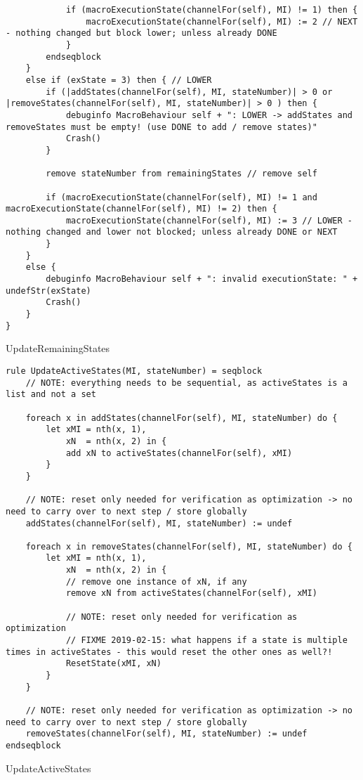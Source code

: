 \begin{listing}[H]
\begin{verbatim}
            if (macroExecutionState(channelFor(self), MI) != 1) then {
                macroExecutionState(channelFor(self), MI) := 2 // NEXT - nothing changed but block lower; unless already DONE
            }
        endseqblock
    }
    else if (exState = 3) then { // LOWER
        if (|addStates(channelFor(self), MI, stateNumber)| > 0 or |removeStates(channelFor(self), MI, stateNumber)| > 0 ) then {
            debuginfo MacroBehaviour self + ": LOWER -> addStates and removeStates must be empty! (use DONE to add / remove states)"
            Crash()
        }

        remove stateNumber from remainingStates // remove self

        if (macroExecutionState(channelFor(self), MI) != 1 and macroExecutionState(channelFor(self), MI) != 2) then {
            macroExecutionState(channelFor(self), MI) := 3 // LOWER - nothing changed and lower not blocked; unless already DONE or NEXT
        }
    }
    else {
        debuginfo MacroBehaviour self + ": invalid executionState: " + undefStr(exState)
        Crash()
    }
}
\end{verbatim}
\caption{UpdateRemainingStates}
\label{lst:asm:UpdateRemainingStates}
\end{listing}




\begin{listing}[H]
\begin{verbatim}
rule UpdateActiveStates(MI, stateNumber) = seqblock
    // NOTE: everything needs to be sequential, as activeStates is a list and not a set

    foreach x in addStates(channelFor(self), MI, stateNumber) do {
        let xMI = nth(x, 1),
            xN  = nth(x, 2) in {
            add xN to activeStates(channelFor(self), xMI)
        }
    }

    // NOTE: reset only needed for verification as optimization -> no need to carry over to next step / store globally
    addStates(channelFor(self), MI, stateNumber) := undef

    foreach x in removeStates(channelFor(self), MI, stateNumber) do {
        let xMI = nth(x, 1),
            xN  = nth(x, 2) in {
            // remove one instance of xN, if any
            remove xN from activeStates(channelFor(self), xMI)

            // NOTE: reset only needed for verification as optimization
            // FIXME 2019-02-15: what happens if a state is multiple times in activeStates - this would reset the other ones as well?!
            ResetState(xMI, xN)
        }
    }

    // NOTE: reset only needed for verification as optimization -> no need to carry over to next step / store globally
    removeStates(channelFor(self), MI, stateNumber) := undef
endseqblock
\end{verbatim}
\caption{UpdateActiveStates}
\label{lst:asm:UpdateActiveStates}
\end{listing}





